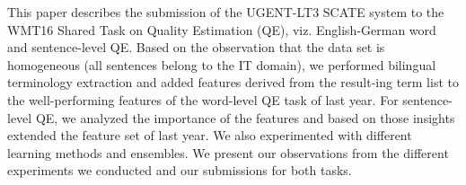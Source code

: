 This paper describes the submission of the UGENT-LT3 SCATE system to the WMT16 Shared Task on Quality Estimation (QE), viz. English-German word and sentence-level QE. Based on the observation that the data set is homogeneous (all sentences belong to the IT domain), we performed bilingual terminology extraction and added features derived from the result-ing term list to the well-performing features of the word-level QE task of last year. For sentence-level QE, we analyzed the importance of the features and based on those insights extended the feature set of last year. We also experimented with different learning methods and ensembles. We present our observations from the different experiments we conducted and our submissions for both tasks.
